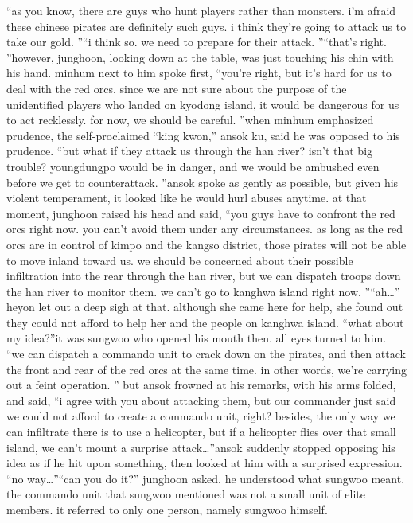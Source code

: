 “as you know, there are guys who hunt players rather than monsters.
 i’m afraid these chinese pirates are definitely such guys.
 i think they’re going to attack us to take our gold.
”“i think so.
 we need to prepare for their attack.
”“that’s right.
”however, junghoon, looking down at the table, was just touching his chin with his hand.
 minhum next to him spoke first, “you’re right, but it’s hard for us to deal with the red orcs.
 since we are not sure about the purpose of the unidentified players who landed on kyodong island, it would be dangerous for us to act recklessly.
 for now, we should be careful.
”when minhum emphasized prudence, the self-proclaimed “king kwon,” ansok ku, said he was opposed to his prudence.
“but what if they attack us through the han river? isn’t that big trouble? youngdungpo would be in danger, and we would be ambushed even before we get to counterattack.
”ansok spoke as gently as possible, but given his violent temperament, it looked like he would hurl abuses anytime.
at that moment, junghoon raised his head and said, “you guys have to confront the red orcs right now.
 you can’t avoid them under any circumstances.
 as long as the red orcs are in control of kimpo and the kangso district, those pirates will not be able to move inland toward us.
 we should be concerned about their possible infiltration into the rear through the han river, but we can dispatch troops down the han river to monitor them.
 we can’t go to kanghwa island right now.
”“ah…” heyon let out a deep sigh at that.
although she came here for help, she found out they could not afford to help her and the people on kanghwa island.
“what about my idea?”it was sungwoo who opened his mouth then.
 all eyes turned to him.
“we can dispatch a commando unit to crack down on the pirates, and then attack the front and rear of the red orcs at the same time.
 in other words, we’re carrying out a feint operation.
”
but ansok frowned at his remarks, with his arms folded, and said, “i agree with you about attacking them, but our commander just said we could not afford to create a commando unit, right? besides, the only way we can infiltrate there is to use a helicopter, but if a helicopter flies over that small island, we can’t mount a surprise attack…”ansok suddenly stopped opposing his idea as if he hit upon something, then looked at him with a surprised expression.
“no way…”“can you do it?” junghoon asked.
 he understood what sungwoo meant.
the commando unit that sungwoo mentioned was not a small unit of elite members.
 it referred to only one person, namely sungwoo himself.
